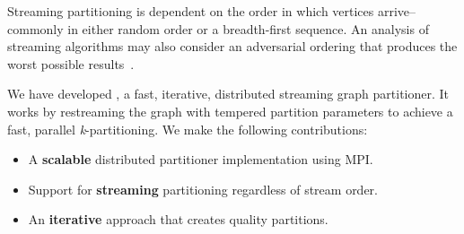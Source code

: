 Streaming partitioning is dependent on the order in which vertices arrive-- commonly in either random order or a breadth-first sequence. An analysis of streaming algorithms may also consider an adversarial ordering that produces the worst possible results~\cite{Stanton:2012:SGP:2339530.2339722}.

We have developed \ourmethod, a fast, iterative, distributed streaming graph partitioner.
It works by restreaming the graph with tempered partition parameters to achieve a fast, parallel \textit{k}-partitioning.
We make the following contributions:
\begin{itemize}
\item A \textbf{scalable} distributed partitioner implementation using MPI.
\item Support for \textbf{streaming} partitioning regardless of stream order.
\item An \textbf{iterative} approach that creates quality partitions.
\end{itemize}



